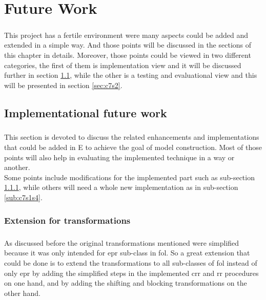 \chapter{Future Work}\label{chap:todo}
	\paragraph{ }
	This project has a fertile environment were many aspects could be added and extended in a simple way.
And those points will be discussed in the sections of this chapter in details. Moreover, those points could be viewed in two different categories, the first of them is implementation view and it will be discussed further in section \ref{sec:c7s1}, while the other is a testing and evaluational view and this will be presented in section \ref{sec:c7s2}. 

	\section{Implementational future work}\label{sec:c7s1}
		\paragraph{ }
		This section is devoted to discuss the related enhancements and implementations that could be added in E to achieve the goal of model construction. Most of those points will also help in evaluating the implemented technique in a way or another.
\\
Some points include modifications for the implemented part such as sub-section \ref{sub:c7s1s1}, while others will need a whole new implementation as in sub-section \ref{sub:c7s1s4}.    

		\subsection{Extension for transformations}\label{sub:c7s1s1}
			\paragraph{ }
			As discussed before the original transformations mentioned were simplified because it was only intended for \ac{epr} sub-class in \ac{fol}. So a great extension that could be done is to extend the transformations to all sub-classes of \ac{fol} instead of only \ac{epr} by adding the simplified steps in the implemented \ac{crr} and \ac{rr} procedures on one hand, and by adding the shifting and blocking transformations on the other hand.
			
